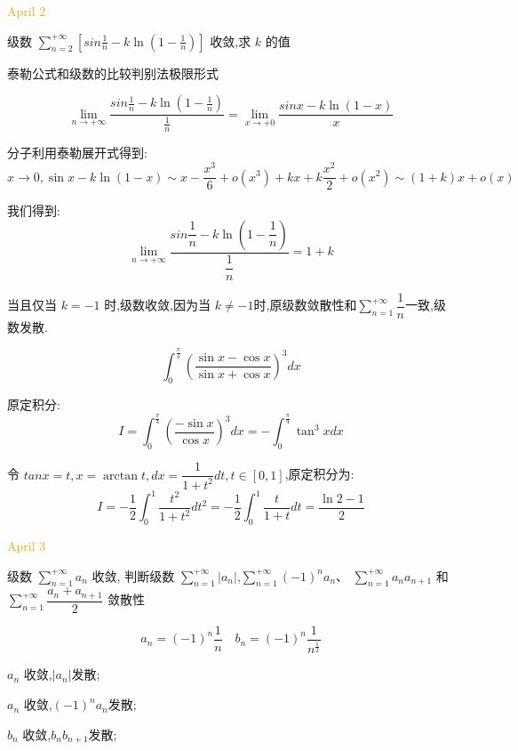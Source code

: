 \textcolor{orange}{April 2}

\begin{example}[][Exam: 30.1.3]
	级数 $\sum\limits_{n=2}^{+\infty}[sin \frac{1}{n}-k\ln(1-\frac{1}{n})]$ 收敛,求 $k$ 的值
\end{example}

\begin{solution}
	
	泰勒公式和级数的比较判别法极限形式
	
	$$\lim\limits_{n\to+\infty}\dfrac{sin \frac{1}{n}-k\ln(1-\frac{1}{n})}{\frac{1}{n}}=\lim\limits_{x\to+0}\dfrac{sin x-k\ln(1-x)}{x}$$
	
	分子利用泰勒展开式得到: 
	$$x\to 0, \sin x-k\ln(1-x)\sim x-\dfrac{x^3}{6}+o(x^3)+kx+k\dfrac{x^2}{2}+o(x^2)\sim (1+k)x+o(x)$$
	
	我们得到: 
	$$\lim\limits_{n\to+\infty}\dfrac{sin \dfrac{1}{n}-k\ln(1-\dfrac{1}{n})}{\dfrac{1}{n}}=1+k$$
	
	当且仅当 $k=-1$ 时,级数收敛,因为当 $k\neq -1$时,原级数敛散性和$\sum\limits_{n=1}^{+\infty}\dfrac{1}{n}$一致,级数发散.
\end{solution}

\begin{example}[][Exam: 30.1.4]
	$$\int_{0}^{\frac{\pi}{4}}\left(\dfrac{\sin x-\cos x}{\sin x+\cos x} \right)^3dx$$
\end{example}

\begin{solution}
	
	原定积分: 
	$$I=\int_{0}^{\frac{\pi}{4}}\left(\frac{-\sin x}{\cos x}\right)^3dx=-\int_{0}^{\frac{\pi}{4}}\tan^{3} xdx$$
	
	令 $tan x=t,x=\arctan t,dx=\dfrac{1}{1+t^2}dt,t\in[0,1]$,原定积分为: 
	$$I=-\frac{1}{2}\int_{0}^{1}\frac{t^2}{1+t^2}dt^2=-\frac{1}{2}\int_{0}^{1}\frac{t}{1+t}dt=\frac{\ln2-1}{2}$$
\end{solution}

\textcolor{orange}{April 3}

\begin{example}[][Exam: 30.1.5]
	级数 $\sum\limits_{n=1}^{+\infty}a_{n}$ 收敛, 判断级数 $\sum\limits_{n=1}^{+\infty}|a_{n}|$,$\sum\limits_{n=1}^{+\infty}(-1)^{n}a_{n}$、
	$\sum\limits_{n=1}^{+\infty}a_{n}a_{n+1}$ 和 $\sum\limits_{n=1}^{+\infty}\dfrac{a_{n}+a_{n+1}}{2}$ 敛散性
\end{example}
\begin{solution}
	
	$$a_{n}=(-1)^n\frac{1}{n}\quad b_{n}=(-1)^n\frac{1}{n^{\frac{1}{2}}}$$
	
	$a_{n}$ 收敛,$|a_{n}|$发散;
	
	$a_{n}$ 收敛,$(-1)^na_{n}$发散;
	
	$b_{n}$ 收敛,$b_{n}b_{n+1}$发散;
\end{solution}

